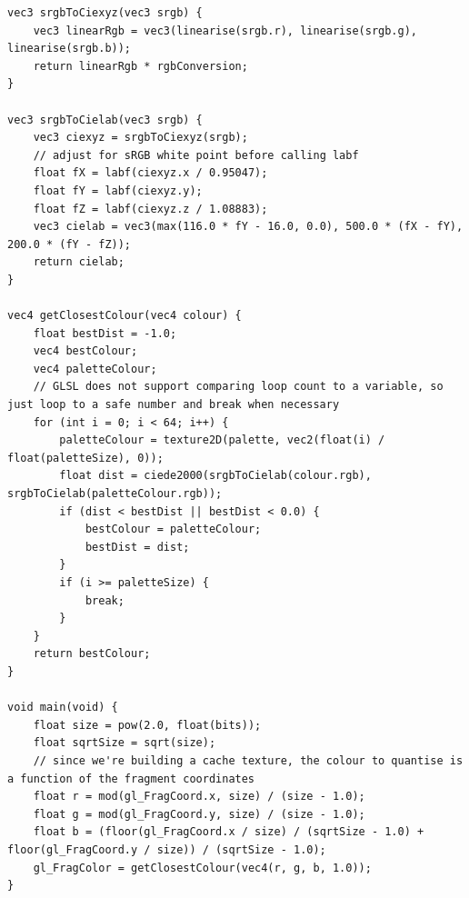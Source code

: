 \documentclass[12pt,twoside,notitlepage]{report}
\begin{document}
\begin{lstlisting}
vec3 srgbToCiexyz(vec3 srgb) {
	vec3 linearRgb = vec3(linearise(srgb.r), linearise(srgb.g), linearise(srgb.b));
	return linearRgb * rgbConversion;
}

vec3 srgbToCielab(vec3 srgb) {
	vec3 ciexyz = srgbToCiexyz(srgb);
	// adjust for sRGB white point before calling labf
	float fX = labf(ciexyz.x / 0.95047);
	float fY = labf(ciexyz.y);
	float fZ = labf(ciexyz.z / 1.08883);
	vec3 cielab = vec3(max(116.0 * fY - 16.0, 0.0), 500.0 * (fX - fY), 200.0 * (fY - fZ));
	return cielab;
}

vec4 getClosestColour(vec4 colour) {
	float bestDist = -1.0;
	vec4 bestColour;
	vec4 paletteColour;
	// GLSL does not support comparing loop count to a variable, so just loop to a safe number and break when necessary
	for (int i = 0; i < 64; i++) {
		paletteColour = texture2D(palette, vec2(float(i) / float(paletteSize), 0));
		float dist = ciede2000(srgbToCielab(colour.rgb), srgbToCielab(paletteColour.rgb));
		if (dist < bestDist || bestDist < 0.0) {
			bestColour = paletteColour;
			bestDist = dist;
		}
		if (i >= paletteSize) {
			break;
		}
	}
	return bestColour;
}

void main(void) {
	float size = pow(2.0, float(bits));
	float sqrtSize = sqrt(size);
	// since we're building a cache texture, the colour to quantise is a function of the fragment coordinates
	float r = mod(gl_FragCoord.x, size) / (size - 1.0);
	float g = mod(gl_FragCoord.y, size) / (size - 1.0);
	float b = (floor(gl_FragCoord.x / size) / (sqrtSize - 1.0) + floor(gl_FragCoord.y / size)) / (sqrtSize - 1.0);
	gl_FragColor = getClosestColour(vec4(r, g, b, 1.0));
}
\end{lstlisting}
\end{document}
